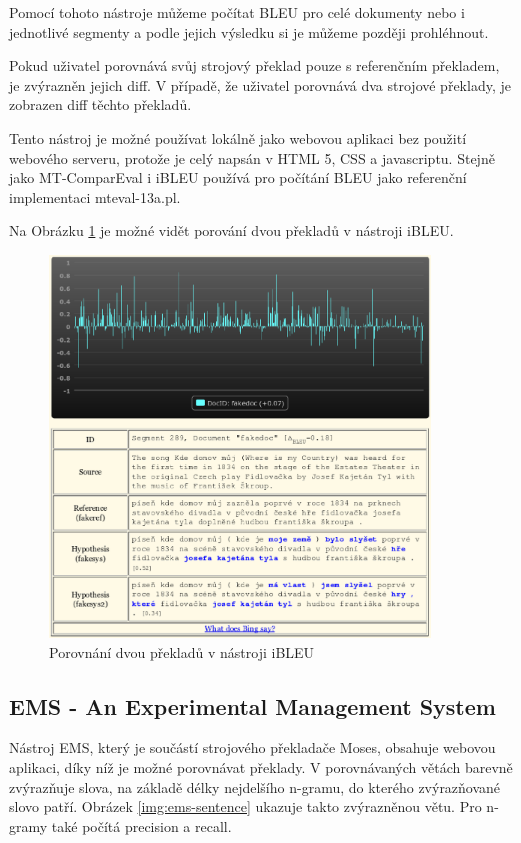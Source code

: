 Pomocí tohoto nástroje můžeme počítat BLEU pro celé dokumenty nebo i jednotlivé segmenty
  a podle jejich výsledku si je můžeme později prohléhnout.

Pokud uživatel porovnává svůj strojový překlad pouze s referenčním překladem,
  je zvýrazněn jejich diff.
V případě, že uživatel porovnává dva strojové překlady,
  je zobrazen diff těchto překladů.

Tento nástroj je možné používat lokálně jako webovou aplikaci bez použití webového serveru,
  protože je celý napsán v HTML 5, CSS a javascriptu.
Stejně jako MT-ComparEval i iBLEU používá pro počítání BLEU jako referenční implementaci mteval-13a.pl.

Na Obrázku \ref{img:ibleu} je možné vidět porování dvou překladů v nástroji iBLEU.
\begin{figure}
  \center
  \includegraphics[width=0.9\textwidth]{img/ibleu.eps}
  \caption{Porovnání dvou překladů v nástroji iBLEU}
  \label{img:ibleu}
\end{figure}


\subsection{EMS - An Experimental Management System}
Nástroj EMS,
  který je součástí strojového překladače Moses,
  obsahuje webovou aplikaci,
  díky níž je možné porovnávat překlady.
V porovnávaných větách barevně zvýrazňuje slova,
  na základě délky nejdelšího n-gramu,
  do kterého zvýrazňované slovo patří.
Obrázek \ref{img:ems-sentence} ukazuje takto zvýrazněnou větu.
Pro n-gramy také počítá precision a recall.

